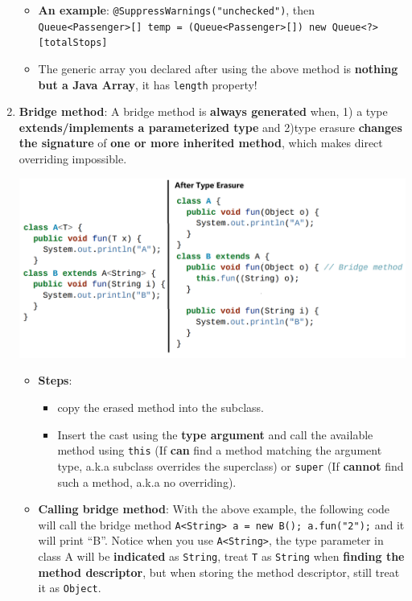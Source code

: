 \documentclass[10pt, landscape]{article}
\begin{document}
\begin{multicols}{4}
\begin{enumerate}
\begin{itemize}
        \item \textbf{An example}: \texttt{@SuppressWarnings("unchecked")}, then \texttt{Queue<Passenger>[] temp = (Queue<Passenger>[]) new Queue<?>[totalStops]}
        \item The generic array you declared after using the above method is \textbf{nothing but a Java Array}, it has \texttt{length} property!
    \end{itemize}
    \item \textbf{Bridge method}: A bridge method is \textbf{always generated} when, 1) a type \textbf{extends/implements a parameterized type} and 2)type erasure\textbf{ changes the signature} of \textbf{one or more inherited method}, which makes direct overriding impossible. \\
    \centerline{\includegraphics[width=1\linewidth]{Paper/Midterm/images/midterm-2.png}}
    \begin{itemize}
        \item \textbf{Steps}:
        \begin{itemize}
            \item copy the erased method into the subclass.
            \item Insert the cast using the \textbf{type argument} and call the available method using \texttt{this} (If \textbf{can} find a method matching the argument type, a.k.a subclass overrides the superclass) or \texttt{super} (If \textbf{cannot} find such a method, a.k.a no overriding).
        \end{itemize}
        \item \textbf{Calling bridge method}: With the above example, the following code will call the bridge method \texttt{A<String> a = new B(); a.fun("2");} and it will print ``B''. Notice when you use \texttt{A<String>}, the type parameter in class A will be \textbf{indicated} as \texttt{String}, treat \texttt{T} as \texttt{String} when \textbf{finding the method descriptor}, but when storing the method descriptor, still treat it as \texttt{Object}.

\end{itemize}
\end{enumerate}
\end{multicols}
\end{document}
